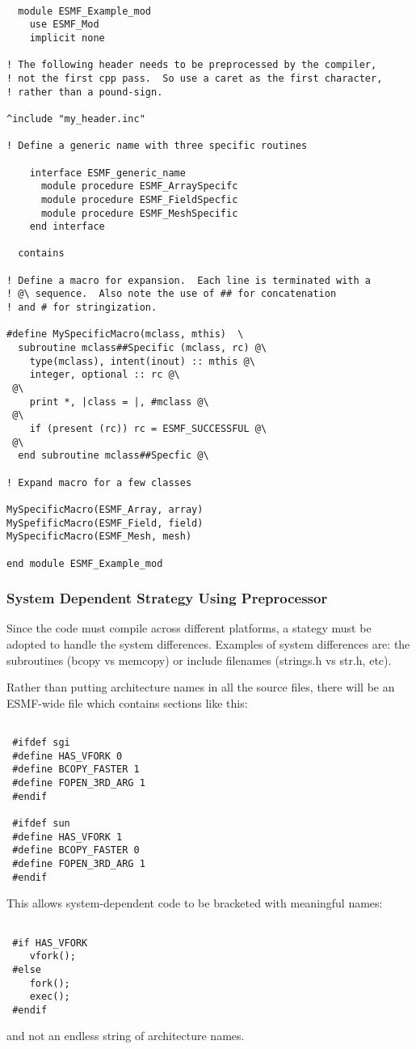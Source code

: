 \begin{verbatim}

  module ESMF_Example_mod
    use ESMF_Mod
    implicit none

! The following header needs to be preprocessed by the compiler,
! not the first cpp pass.  So use a caret as the first character,
! rather than a pound-sign.

^include "my_header.inc"

! Define a generic name with three specific routines

    interface ESMF_generic_name
      module procedure ESMF_ArraySpecifc
      module procedure ESMF_FieldSpecfic
      module procedure ESMF_MeshSpecific
    end interface

  contains

! Define a macro for expansion.  Each line is terminated with a
! @\ sequence.  Also note the use of ## for concatenation
! and # for stringization.

#define MySpecificMacro(mclass, mthis)  \
  subroutine mclass##Specific (mclass, rc) @\
    type(mclass), intent(inout) :: mthis @\
    integer, optional :: rc @\
 @\
    print *, |class = |, #mclass @\
 @\
    if (present (rc)) rc = ESMF_SUCCESSFUL @\
 @\
  end subroutine mclass##Specfic @\

! Expand macro for a few classes

MySpecificMacro(ESMF_Array, array)
MySpefificMacro(ESMF_Field, field)
MySpecificMacro(ESMF_Mesh, mesh)

end module ESMF_Example_mod

\end{verbatim}

\subsubsection{System Dependent Strategy Using Preprocessor} Since the code
must compile across different platforms, a stategy must be adopted to
handle the system differences. Examples of system differences are: the
subroutines (bcopy vs memcopy) or include filenames (strings.h vs str.h,
etc).

Rather than putting architecture names in all the source files, there will
be an ESMF-wide file which contains sections like this: 
\begin{verbatim}

 #ifdef sgi 
 #define HAS_VFORK 0 
 #define BCOPY_FASTER 1 
 #define FOPEN_3RD_ARG 1 
 #endif

 #ifdef sun 
 #define HAS_VFORK 1 
 #define BCOPY_FASTER 0 
 #define FOPEN_3RD_ARG 1 
 #endif

\end{verbatim} This allows system-dependent code to be bracketed with
meaningful names: 

\begin{verbatim} 

 #if HAS_VFORK
    vfork();
 #else
    fork(); 
    exec();
 #endif

\end{verbatim} 
and not an endless string of architecture names.

